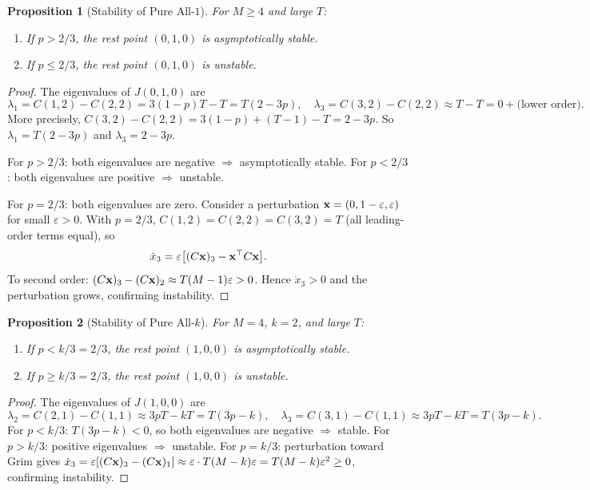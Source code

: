 \documentclass[12pt,a4paper]{article}
\newtheorem{proposition}{Proposition}[section]
\begin{document}
\begin{proposition}[Stability of Pure All-$1$]\label{prop:stab_allone}
For $M\geq 4$ and large $T$:
\begin{enumerate}
  \item If $p>2/3$, the rest point $(0,1,0)$ is asymptotically stable.
  \item If $p\leq 2/3$, the rest point $(0,1,0)$ is unstable.
\end{enumerate}
\end{proposition}

\begin{proof}
The eigenvalues of $J(0,1,0)$ are
\[
  \lambda_1 = C(1,2)-C(2,2) = 3(1-p)T-T = T(2-3p),\quad
  \lambda_3 = C(3,2)-C(2,2) \approx T-T = 0+\text{(lower order)}.
\]
More precisely, $C(3,2)-C(2,2)=3(1-p)+(T-1)-T=2-3p$.
So $\lambda_1=T(2-3p)$ and $\lambda_3=2-3p$.

For $p>2/3$: both eigenvalues are negative $\Rightarrow$ asymptotically stable.
For $p<2/3$: both eigenvalues are positive $\Rightarrow$ unstable.

For $p=2/3$: both eigenvalues are zero. Consider a perturbation
${\bf x}=(0,1-\varepsilon,\varepsilon)$ for small $\varepsilon>0$. With
$p=2/3$, $C(1,2)=C(2,2)=C(3,2)=T$ (all leading-order terms equal), so
\[
  \dot{x}_3 = \varepsilon\bigl[(C{\bf x})_3 - {\bf x}^\top C{\bf x}\bigr].
\]
To second order: $(C{\bf x})_3 - (C{\bf x})_2 \approx T(M-1)\varepsilon > 0$.
Hence $\dot{x}_3>0$ and the perturbation grows, confirming instability.
\end{proof}

\begin{proposition}[Stability of Pure All-$k$]\label{prop:stab_allk}
For $M=4$, $k=2$, and large $T$:
\begin{enumerate}
  \item If $p<k/3=2/3$, the rest point $(1,0,0)$ is asymptotically stable.
  \item If $p\geq k/3=2/3$, the rest point $(1,0,0)$ is unstable.
\end{enumerate}
\end{proposition}

\begin{proof}
The eigenvalues of $J(1,0,0)$ are
\[
  \lambda_2 = C(2,1)-C(1,1) \approx 3pT - kT = T(3p-k),\quad
  \lambda_3 = C(3,1)-C(1,1) \approx 3pT - kT = T(3p-k).
\]
For $p<k/3$: $T(3p-k)<0$, so both eigenvalues are negative $\Rightarrow$ stable.
For $p>k/3$: positive eigenvalues $\Rightarrow$ unstable.
For $p=k/3$: perturbation toward Grim gives
$\dot{x}_3=\varepsilon[(C{\bf x})_3-(C{\bf x})_1]\approx\varepsilon\cdot T(M-k)\varepsilon=T(M-k)\varepsilon^2\geq 0$,
confirming instability.
\end{proof}
\end{document}
